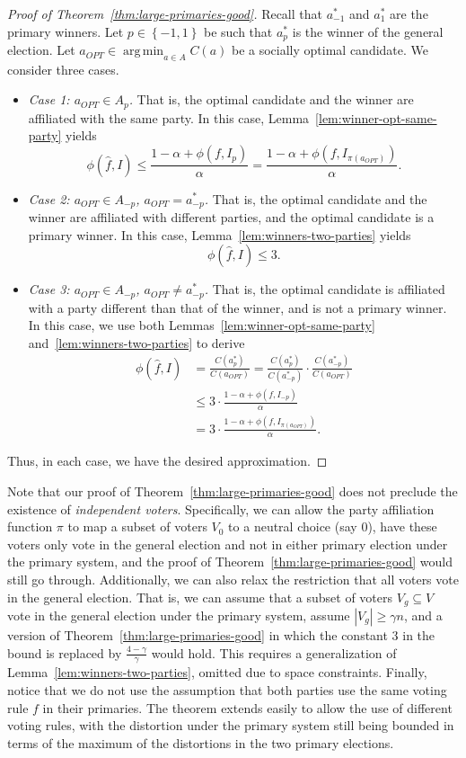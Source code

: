 \documentclass[letterpaper]{article} %
\theoremstyle{definition}
\newcommand{\set}[1]{\left\{#1\right\}}
\renewcommand{\hat}{\widehat}
\DeclareMathOperator*{\argmin}{\arg\,\min}
\newcommand{\pleft}{-1}
\newcommand{\pright}{1}
\begin{document}
\begin{proof}[Proof of Theorem~\ref{thm:large-primaries-good}]
	Recall that $a^*_{\pleft}$ and $a^*_{\pright}$ are the primary winners. Let $p \in \set{\pleft,\pright}$ be such that $a^*_p$ is the winner of the general election. Let $a_{OPT} \in \argmin_{a \in A} C(a)$ be a socially optimal candidate. We consider three cases.
	\begin{itemize}
		\item \emph{Case 1: $a_{OPT} \in A_p$.} That is, the optimal candidate and the winner are affiliated with the same party. In this case, Lemma~\ref{lem:winner-opt-same-party} yields
		$$
		\phi(\hat{f},I) \le \frac{1-\alpha + \phi(f,I_p)}{\alpha}=\frac{1-\alpha + \phi(f,I_{\pi(a_{OPT})})}{\alpha}.
		$$
		\item \emph{Case 2: $a_{OPT} \in A_{-p}$, $a_{OPT} = a^*_{-p}$.} That is, the optimal candidate and the winner are affiliated with different parties, and the optimal candidate is a primary winner. In this case, Lemma~\ref{lem:winners-two-parties} yields
		$$
		\phi(\hat{f},I) \le 3.
		$$
		\item \emph{Case 3: $a_{OPT} \in A_{-p}$, $a_{OPT} \neq a^*_{-p}$.} That is, the optimal candidate is affiliated with a party different than that of the winner, and is not a primary winner. In this case, we use both Lemmas~\ref{lem:winner-opt-same-party} and~\ref{lem:winners-two-parties} to derive
		\begin{align}
		\phi(\hat{f},I) &= \frac{C(a^*_p)}{C(a_{OPT})} = \frac{C(a^*_p)}{C(a^*_{-p})} \cdot \frac{C(a^*_{-p})}{C(a_{OPT})} \\
		&\le 3 \cdot \frac{1-\alpha+\phi(f,I_{-p})}{\alpha} \\
		&=3 \cdot \frac{1-\alpha+\phi(f,I_{\pi(a_{OPT})})}{\alpha}.
		\end{align}
		\normalsize
	\end{itemize}
	Thus, in each case, we have the desired approximation.
\end{proof}
Note that our proof of Theorem~\ref{thm:large-primaries-good} does not preclude the existence of \emph{independent voters}. Specifically, we can allow the party affiliation function $\pi$ to map a subset of voters $V_0$ to a neutral choice (say $0$), have these voters only vote in the general election and not in either primary election under the primary system, and the proof of Theorem~\ref{thm:large-primaries-good} would still go through. Additionally, we can also relax the restriction that all voters vote in the general election. That is, we can assume that a subset of voters $V_g \subseteq V$ vote in the general election under the primary system, assume $|V_g| \ge \gamma n$, and a version of Theorem~\ref{thm:large-primaries-good} in which the constant $3$ in the bound is replaced by $\frac{4-\gamma}{\gamma}$ would hold. This requires a generalization of Lemma~\ref{lem:winners-two-parties}, omitted due to space constraints. Finally, notice that we do not use the assumption that both parties use the same voting rule $f$ in their primaries. The theorem extends easily to allow the use of different voting rules, with the distortion under the primary system still being bounded in terms of the maximum of the distortions in the two primary elections.
\end{document}
